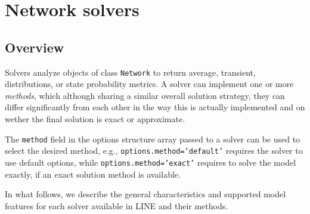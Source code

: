 \chapter{Network solvers}
\label{Network-solvers}
\section{Overview}
Solvers analyze objects of class \texttt{Network} to return average, transient, distributions, or state probability metrics. A solver can implement one or more {\em methods}, which although sharing a similar overall solution strategy, they can differ significantly from each other in the way this is actually implemented and on wether the final solution is exact or approximate.

The \texttt{method} field in the options structure array passed to a solver can be used to select the desired method, e.g., \texttt{options.method='default'} requires the solver to use default options, while \texttt{options.method='exact'} requires to solve the model exactly, if an exact solution method is available.

In what follows, we describe the general characteristics and supported model features for each solver available in \textsc{LINE} and their methods.
